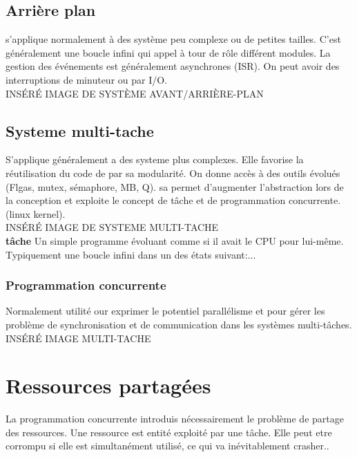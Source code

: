 \documentclass[oneside]{book}
\begin{document}
    \subsection{Arrière plan}
    s'applique normalement à des système peu complexe ou de petites tailles. C'est généralement une boucle infini qui appel à tour de rôle différent modules. La gestion des événements est généralement asynchrones (ISR). On peut avoir des interruptions de minuteur ou par I/O.\\
    
    INSÉRÉ IMAGE DE SYSTÈME AVANT/ARRIÈRE-PLAN\\
    
    \subsection{Systeme multi-tache}
    S'applique généralement a des systeme plus complexes. Elle favorise la réutilisation du code de par sa modularité. On donne accès à des outils évolués (Flgas, mutex, sémaphore, MB, Q). sa permet d'augmenter l'abstraction lors de la conception et exploite le concept de tâche et de programmation concurrente. (linux kernel).\\
    
    INSÉRÉ IMAGE DE SYSTEME MULTI-TACHE\\
    
    \textbf{tâche} Un simple programme évoluant comme si il avait le CPU pour lui-même. Typiquement une boucle infini dans un des états suivant:...\\
    
    \subsubsection{Programmation concurrente}
    Normalement utilité our exprimer le potentiel parallélisme et pour gérer les problème de synchronisation et de communication dans les systèmes multi-tâches.\\
    
    INSÉRÉ IMAGE MULTI-TACHE\\
    
    \section{Ressources partagées}
    La programmation concurrente introduis nécessairement le problème de partage des ressources. Une ressource est entité exploité par une tâche. Elle peut etre corrompu si elle est simultanément utilisé, ce qui va inévitablement crasher.. \\
    
\end{document}
